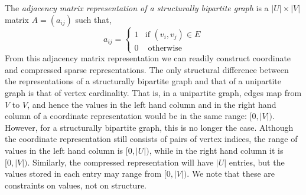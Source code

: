 The \emph{adjacency matrix representation of a structurally bipartite graph} is
a $|U|\times |V|$ matrix $A = (a_{ij})$ such that,
\[
 a_{i j} = 
 \left\{
 \begin{array}{rl}
  1 & \textrm{if } (v_i, v_j) \in E \\
  0 & \textrm { otherwise }
 \end{array}
 \right.
 \]
From this adjacency matrix representation we can readily construct  coordinate and compressed sparse representations.  The only structural difference between the representations of a structurally bipartite graph and that of a unipartite graph is that of vertex cardinality.  That is, in a unipartite graph, edges map from $V$ to $V$, and hence the values in the left hand column and in the right hand column of a coordinate representation would be in the same range: $[0, |V|)$.  However, for a structurally bipartite graph, this is no longer the case.  Although the coordinate representation still consists of pairs of vertex indices, the range of values in the left hand column is $[0, |U|)$, while in the right hand column it is $[0, |V|)$.  Similarly, the compressed representation will have $|U|$ entries, but the values stored in each entry may range from $[0, |V|)$.  We note that these are constraints on values, not on structure.
 

